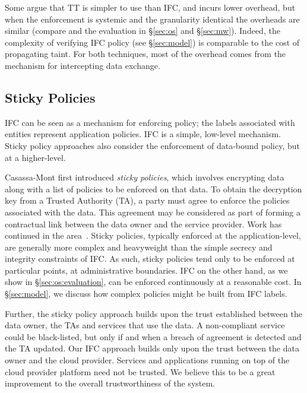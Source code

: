 \documentclass[10pt,journal,compsoc]{IEEEtran}
\begin{document}
Some argue that TT is simpler to use than IFC, and incurs lower overhead,
 but when the enforcement is systemic and the granularity identical the overheads are similar (compare \cite{Enck:2010:TIT:1924943.1924971} and the evaluation in \S\ref{sec:os} and \S\ref{sec:mw}).
Indeed, the complexity of verifying IFC policy (see \S\ref{sec:model}) is  comparable to the cost of propagating taint. 
For both techniques, most of the overhead comes from the mechanism for intercepting data exchange.


\subsection{Sticky Policies}
\label{sec:background:sticky}

IFC can be seen as a mechanism for enforcing policy; the labels associated with entities represent application policies. 
IFC is a simple, low-level mechanism.
Sticky policy approaches also consider the enforcement of data-bound policy, but at a higher-level.





Casassa-Mont \etal \cite{hpsticky} first introduced \emph{sticky policies}, which involves encrypting data along with a list of policies to be enforced on that data.
To obtain the decryption key from a Trusted Authority (TA), a party must agree to enforce the policies associated with the data.
This agreement may be considered as part of forming a contractual link between the data owner and the service provider.
Work has continued in the area~\cite{bandhakavi2006super, chadwick2008enforcing, casassa2014towards}. 
Sticky policies, typically enforced at the application-level, are generally more complex and heavyweight than the simple secrecy and integrity constraints of IFC. As such, sticky policies tend only to be enforced at particular points, \eg at administrative boundaries.
IFC on the other hand, as we show in \S\ref{sec:os:evaluation}, can be enforced continuously at a reasonable cost.
In \S\ref{sec:model}, we discuss how complex policies might be built from IFC labels.


Further, the sticky policy approach builds upon the trust established between the data owner, the TAs and services that use the data.
A non-compliant service could be black-listed, but only if and when a breach of agreement is detected and the TA updated.
Our IFC approach builds only upon the trust between the data owner and the cloud provider.
Services and applications running on top of the cloud provider platform need not be trusted.
We believe this to be a great improvement to the overall trustworthiness of the system.
\end{document}
